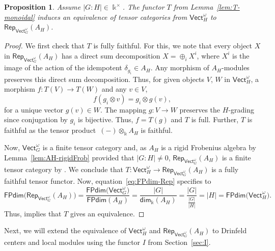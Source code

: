 \documentclass[pdftex]{sigma}
\numberwithin{equation}{section}
\newtheorem{Proposition}[Theorem]{Proposition}
 { \theoremstyle{definition}
\newtheorem{Definition}[Theorem]{Definition}
\newtheorem{Note}[Theorem]{Note}
\newtheorem{Notation}[Theorem]{Notation}
\newtheorem{Example}[Theorem]{Example}
\newtheorem{Remark}[Theorem]{Remark} }
\newcommand{\FPdim}{\mathsf{FPdim}}
\renewcommand{\dim}{\mathsf{dim}}
\newcommand{\Rep}{\mathsf{Rep}}
\newcommand{\Vect}{\mathsf{Vect}}
\newcommand{\rI}{I}
\begin{document}
\begin{Proposition}\label{prop:RepAH-equiv}
Assume $|G:H|\in \Bbbk^\times$. The functor $T$ from Lemma~{\rm \ref{lem:T-monoidal}} induces an equivalence of tensor categories from $\Vect_H^\omega$ to $\Rep_{\Vect_G^\omega}(A_H)$.
\end{Proposition}
\begin{proof}
We first check that $T$ is fully faithful. For this, we note that every object $X$ in $\Rep_{\Vect_G^\omega}(A_H)$ has a direct sum decomposition
$X=\oplus_iX^i$, where $X^i$ is the image of the action of the idempotent $\delta_{g_i}\in A_H$. Any morphism of $A_H$-modules preserves this direct sum decomposition. Thus, for given objects $V$, $W$ in $\Vect_H^\omega$, a morphism $f\colon T(V)\to T(W)$ and any $v\in V$,
\[f(g_i\otimes v)=g_i\otimes g(v),\]
for a unique vector $g(v)\in W$. The mapping $g\colon V\to W$ preserves the $H$-grading since conjugation by $g_i$ is bijective. Thus, $f=T(g)$ and $T$ is full. Further, $T$ is faithful as the tensor product~${(-)\otimes_\Bbbk A_H}$ is faithful.

Now, $\Vect_G^\omega$ is a finite tensor category and, as $A_H$ is a rigid Frobenius algebra by Lemma~\ref{lem:AH-rigidFrob} provided that $|G:H|\neq 0$, $\Rep_{\Vect_G^\omega}(A_H)$ is a finite tensor category by \cite[Corollary 4.21]{LW3}. We conclude that $T\colon \Vect_H^\omega\to \Rep_{\Vect_G^\omega}(A_H)$ is a fully faithful tensor functor. Now, equation~\eqref{eq:FPdim-Rep} specifies to
\[\FPdim\big(\Rep_{\Vect_G^\omega}(A_H)\big)=\frac{\FPdim\big(\Vect_G^\omega\big)}{\FPdim(A_H)}=\frac{|G|}{\dim_\Bbbk(A_H)}=\frac{|G|}{\frac{|G|}{|H|}}=|H|=\FPdim\big(\Vect_H^\omega\big).\]
Thus, \cite[Proposition~6.3.3]{EGNO} implies that $T$ gives an equivalence.
\end{proof}

Next, we will extend the equivalence of $\Vect_H^\omega$ and $\Rep_{\Vect_G^\omega}(A_H)$ to Drinfeld centers and local modules using the functor $\rI$ from Section~\ref{sec:I}.
\end{document}
